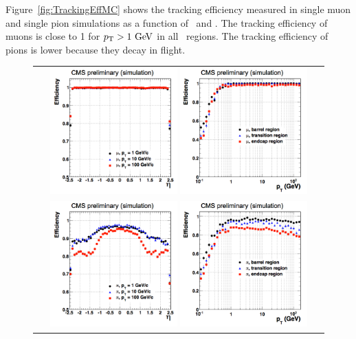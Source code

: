 Figure~\ref{fig:TrackingEffMC} shows the tracking efficiency 
measured in single muon and single pion simulations as a function 
of \pt\ and \Eta. The tracking efficiency of muons is close to 1 
for $p_\mathrm{T}>1~\mathrm{Ge\kern -0.1em V}$ in all \Eta\ regions. The tracking efficiency 
of pions is lower because they decay in flight. 

\begin{figure}[htp] 
\centering 
\begin{tabular}{c} 
\includegraphics[width=0.45\textwidth]{figures/eff_muon_vs_eta.png} 
\includegraphics[width=0.45\textwidth]{figures/eff_muon_vs_pt.png} \\
\includegraphics[width=0.45\textwidth]{figures/eff_pion_vs_eta.png} 
\includegraphics[width=0.45\textwidth]{figures/eff_pion_vs_pt.png} 

\end{tabular}
\end{figure}
